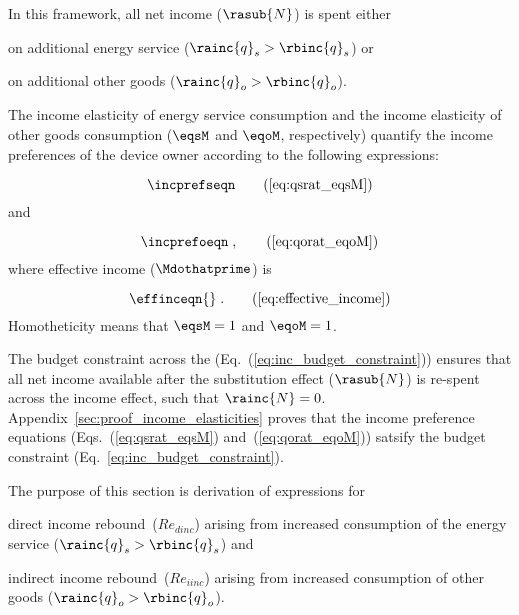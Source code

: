 In this framework, all net income ($\rasub{N}$) is spent either 
%
\begin{enumerate*}[label={(\alph*)}]
	
  \item on additional energy service ($\rainc{q}_s > \rbinc{q}_s$) or
  
  \item on additional other goods ($\rainc{q}_o > \rbinc{q}_o$).
    
\end{enumerate*}
%
The income elasticity of energy service consumption and 
the income elasticity of other goods consumption 
($\eqsM$ and $\eqoM$, respectively)
quantify the income preferences of the device owner according to the following expressions:

\begin{equation}
  \incprefseqn \tag{\ref{eq:qsrat_eqsM}}
\end{equation}
%
and

\begin{equation}
  \incprefoeqn \; , \tag{\ref{eq:qorat_eqoM}}
\end{equation}
%
where effective income ($\Mdothatprime$) is

\begin{equation}
  \effinceqn{} \; . \tag{\ref{eq:effective_income}}
\end{equation}
%
Homotheticity means that $\eqsM = 1$ and $\eqoM = 1$.

The budget constraint across the \inceffect{} (Eq.~(\ref{eq:inc_budget_constraint})) 
ensures that all net income available after the substitution effect ($\rasub{N}$) 
is re-spent across the income effect, 
such that $\rainc{N} = 0$.
Appendix~\ref{sec:proof_income_elasticities} proves that
the income preference equations (Eqs.~(\ref{eq:qsrat_eqsM}) and~(\ref{eq:qorat_eqoM})) 
satsify the budget constraint (Eq.~\ref{eq:inc_budget_constraint}).

The purpose of this section is derivation of expressions for 
%
\begin{enumerate*}[label={(\alph*)}]
	
  \item direct income rebound~($Re_{dinc}$) 
        arising from increased consumption of the energy service 
        ($\rainc{q}_s > \rbinc{q}_s$) and
  
  \item indirect income rebound~($Re_{iinc}$) 
        arising from increased consumption of other goods 
        ($\rainc{q}_o > \rbinc{q}_o$).
    
\end{enumerate*}

